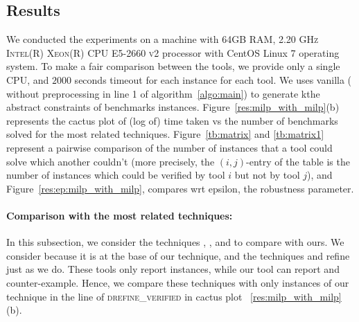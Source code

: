 \subsection{Results}
We conducted the experiments on a machine with \textsc{64GB RAM, 2.20 GHz Intel(R) Xeon(R) CPU E5-2660 v2}
processor with CentOS Linux 7 operating system. 
To make a fair comparison between the tools, we provide only a single \textsc{CPU}, and $2000$ seconds timeout for each instance for each tool. 
We uses vanilla \deeppoly{}(\deeppoly{} without preprocessing in line 1 of algorithm~\ref{algo:main}) 
to generate kthe abstract constraints of benchmarks instances.
Figure~\ref{res:milp_with_milp}(b) represents the cactus plot of (log of) time taken vs the number of benchmarks 
solved for the most related techniques. Figure~\ref{tb:matrix} and \ref{tb:matrix1} represent a 
pairwise comparison of the number of 
instances that a tool could solve which another couldn't  
(more precisely, the $(i,j)$-entry of the table is the number of instances which could be verified 
by tool $i$ but not by tool $j$), and Figure~\ref{res:ep:milp_with_milp}, compares wrt epsilon, the robustness parameter.






\paragraph{Comparison with the most related techniques:}
In this subsection, we consider the techniques \deeppoly{}, \kpoly{}, and \deepsrgr{} to compare with ours. 
We consider \deeppoly{} because it is at the base of our technique, and the techniques \kpoly{} and \deepsrgr{} refine \deeppoly{} just as we do. These tools only report \verified{} instances, while our tool can report  \verified{} and counter-example. Hence, we compare these techniques with only \verified{}  instances of our technique in the line of \textsc{drefine\_verified} in cactus plot ~\ref{res:milp_with_milp}(b). 

